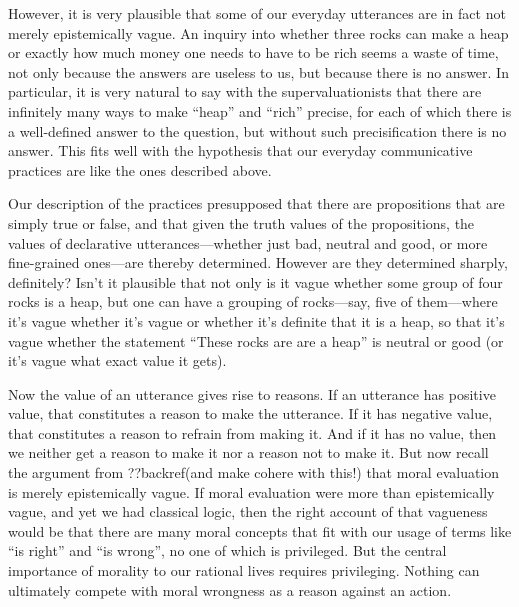 However, it is very plausible that some of our everyday utterances are in fact not merely epistemically vague. An inquiry into whether three rocks can make 
a heap or exactly how much money one needs to have to be rich seems a waste of time, not only because the answers are useless to us, 
but because there is no answer. In particular, it is very natural to say with the supervaluationists that there are infinitely many 
ways to make ``heap'' and ``rich'' precise, for each of which there is a well-defined answer to the question, but without such
precisification there is no answer. This fits well with the hypothesis that our everyday communicative practices are  
like the ones described above. 

Our description of the practices presupposed that there are propositions that are simply true or false, and that given the truth
values of the propositions, the values of declarative utterances---whether just bad, neutral and good, or more fine-grained ones---are thereby
determined. However are they determined sharply, definitely? Isn't it plausible that not only is it vague whether some group of four rocks is a heap, 
but one can have a grouping of rocks---say, five of them---where it's vague whether it's vague or whether it's definite that it is a heap, so that 
it's vague whether the statement ``These rocks are are a heap'' is neutral or good (or it's vague what exact value it gets).

Now the value of an utterance gives rise to reasons. If an utterance has positive value, that constitutes a reason to make the utterance.
If it has negative value, that constitutes a reason to refrain from making it. And if it has no value, then we neither get a reason to make
it nor a reason not to make it. But now recall the argument from ??backref(and make cohere with this!) that moral evaluation is merely 
epistemically vague. If moral evaluation were more than epistemically vague, and yet we had classical logic, then the right account 
of that vagueness would be that there
are many moral concepts that fit with our usage of terms like ``is right'' and ``is wrong'', no one of which is privileged. But the 
central importance of morality to our rational lives requires privileging. Nothing can ultimately compete with moral wrongness as a reason
against an action. 

